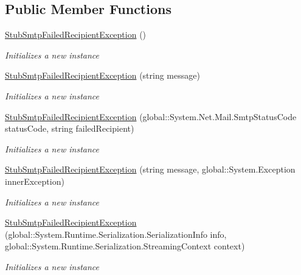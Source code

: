 \subsection*{Public Member Functions}
\begin{DoxyCompactItemize}
\item 
\hyperlink{class_system_1_1_net_1_1_mail_1_1_fakes_1_1_stub_smtp_failed_recipient_exception_a300a9b30c07490eafd53c998e4542862}{Stub\-Smtp\-Failed\-Recipient\-Exception} ()
\begin{DoxyCompactList}\small\item\em Initializes a new instance\end{DoxyCompactList}\item 
\hyperlink{class_system_1_1_net_1_1_mail_1_1_fakes_1_1_stub_smtp_failed_recipient_exception_a4c2c030e2f103d080a9ebb0107091a45}{Stub\-Smtp\-Failed\-Recipient\-Exception} (string message)
\begin{DoxyCompactList}\small\item\em Initializes a new instance\end{DoxyCompactList}\item 
\hyperlink{class_system_1_1_net_1_1_mail_1_1_fakes_1_1_stub_smtp_failed_recipient_exception_af3bfc48e37943762e749f0f995f1f9fd}{Stub\-Smtp\-Failed\-Recipient\-Exception} (global\-::\-System.\-Net.\-Mail.\-Smtp\-Status\-Code status\-Code, string failed\-Recipient)
\begin{DoxyCompactList}\small\item\em Initializes a new instance\end{DoxyCompactList}\item 
\hyperlink{class_system_1_1_net_1_1_mail_1_1_fakes_1_1_stub_smtp_failed_recipient_exception_aba650c5168668aecdbdba89080fe4760}{Stub\-Smtp\-Failed\-Recipient\-Exception} (string message, global\-::\-System.\-Exception inner\-Exception)
\begin{DoxyCompactList}\small\item\em Initializes a new instance\end{DoxyCompactList}\item 
\hyperlink{class_system_1_1_net_1_1_mail_1_1_fakes_1_1_stub_smtp_failed_recipient_exception_a7173ec61485aea152b8afd692d240b77}{Stub\-Smtp\-Failed\-Recipient\-Exception} (global\-::\-System.\-Runtime.\-Serialization.\-Serialization\-Info info, global\-::\-System.\-Runtime.\-Serialization.\-Streaming\-Context context)
\begin{DoxyCompactList}\small\item\em Initializes a new instance\end{DoxyCompactList}\item 

\end{DoxyCompactItemize}
